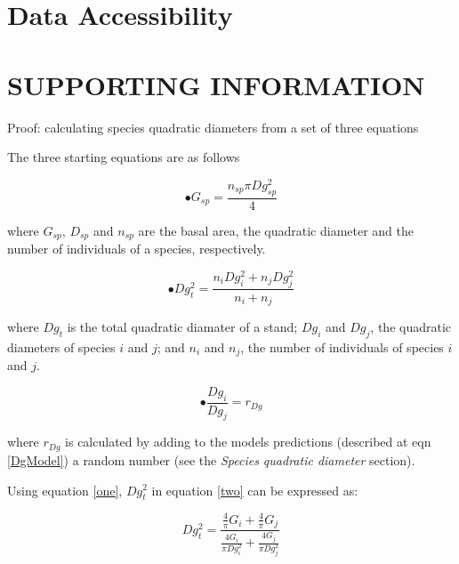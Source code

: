\documentclass[a4paper]{article}
\begin{document}
\section*{Data Accessibility}




\clearpage

\section*{SUPPORTING INFORMATION}


\clearpage

\noindent Proof: calculating species quadratic diameters from a set of three equations

\noindent The three starting equations are as follows

\begin{equation}\label{one}\tag{a}
  \bullet G_{sp} = \frac{n_{sp}\pi Dg_{sp}^2}{4}
\end{equation}

\noindent where $G_{sp}$, $D_{sp}$ and $n_{sp}$ are the basal area, the quadratic diameter and the number of individuals of a species, respectively.

\begin{equation}\label{two}\tag{b}
  \bullet Dg_t^2 = \frac{n_iDg_i^2 + n_jDg_j^2}{n_i + n_j}
\end{equation}

\noindent where $Dg_t$ is the total quadratic diamater of a stand; $Dg_i$ and $Dg_j$, the quadratic diameters of species $i$ and $j$; and $n_i$ and $n_j$, the number of individuals of species $i$ and $j$.

\begin{equation}\label{three}\tag{c}
  \bullet \frac{Dg_i}{Dg_j} = r_{Dg}
\end{equation}

\noindent where $r_{Dg}$ is calculated by adding to the models predictions (described at eqn \ref{DgModel}) a random number (see the \textit{Species quadratic diameter} section).

\hfill

\noindent Using equation \ref{one}, $Dg_t^2$ in equation \ref{two} can be expressed as:

\begin{equation*}\label{}
  Dg_t^2 = \frac{\frac{4}{\pi}G_i + \frac{4}{\pi}G_j}{\frac{4G_i}{\pi Dg_i^2} + \frac{4G_j}{\pi Dg_j^2}}
\end{equation*}
\end{document}
